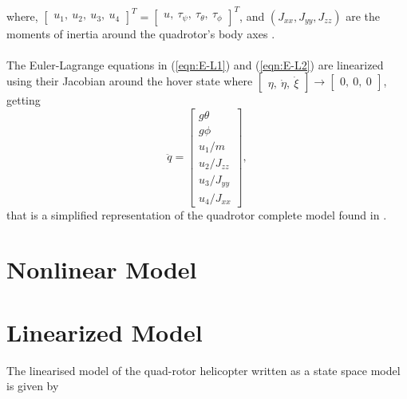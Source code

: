 where, $\begin{bmatrix}
u_{1},\ u_{2},\ u_{3}, \ u_{4}
\end{bmatrix}^{T} = \begin{bmatrix}
u,\ \tau_{\psi},\ \tau_{\theta},\ \tau_{\phi}
\end{bmatrix}^{T} $, and $ (J_{xx}, J_{yy}, J_{zz}) $ are the moments of inertia around the quadrotor's body axes \cite{Emam2016, Badr2016}.
\\\\
The Euler-Lagrange equations in (\ref{eqn:E-L1}) and (\ref{eqn:E-L2}) are linearized using their Jacobian around the hover state where $\begin{bmatrix}
\eta,\ \dot{\eta},\ \dot{\xi}
\end{bmatrix} \to \begin{bmatrix}
0,\ 0,\ 0
\end{bmatrix}$, getting
\begin{equation}
\label{eqn:linear}
\ddot{q}
=
\begin{bmatrix}
g\theta \\
g\phi\\
u_{1}/m \\
u_{2}/J_{zz} \\
u_{3}/J_{yy} \\
u_{4}/J_{xx}
\end{bmatrix},
\end{equation}
that is a simplified representation of the quadrotor complete model found in \cite{Bouabdallah2007}.

\section{Nonlinear Model}

\section{Linearized Model}
\setcounter{MaxMatrixCols}{20}

The linearised model of the quad-rotor helicopter written as a state space model is given by

